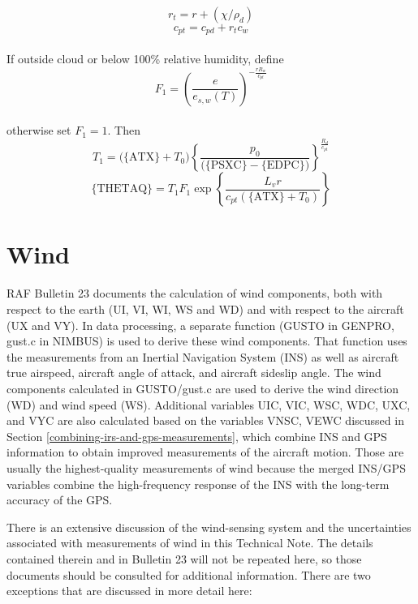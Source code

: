 \documentclass[
  english,
]{book}
\begin{document}
\begin{equation}
r_{t}=r+(\chi/\rho_{d})
\label{eq:rtotBox}
\end{equation}
\begin{equation}
c_{pt}=c_{pd}+r_{t}c_{w}
\label{eq:cptBox}
\end{equation}\\
If outside cloud or below 100\% relative humidity, define\\
\begin{equation}
F_{1}=\left(\frac{e}{e_{s,w}(T)}\right)^{-\frac{rR_{w}}{c_{pt}}}
\label{eq:F1}
\end{equation}\\
otherwise set \(F_{1}=1\). Then\\
\begin{equation}
T_{1}=\mathrm{(\{ATX\}}+T_{0})\left\{ \frac{p_{0}}{(\mathrm{\{PSXC\}}-\mathrm{\{EDPC\})}}\right\} ^{\frac{R_{d}}{c_{pt}}}
\label{eq:T1box}
\end{equation}
\begin{equation}
\mathrm{\{THETAQ\}}=T_{1}F_{1}\exp\left\{ \frac{L_{v}r}{c_{pt}(\{\mathrm{ATX\}}+T_{0})}\right\}
\label{eq:THETAQbox}
\end{equation}

\hypertarget{wind}{%
\section{Wind}\label{wind}}

RAF Bulletin 23 documents the calculation of wind components, both with respect to the earth (UI, VI, WI, WS and WD) and with respect to the aircraft (UX and VY). In data processing, a separate function (GUSTO in GENPRO, gust.c in NIMBUS) is used to derive these wind components. That function uses the measurements from an Inertial Navigation System (INS) as well as aircraft true airspeed, aircraft angle of attack, and aircraft sideslip angle. The wind components calculated in GUSTO/gust.c are used to derive the wind direction (WD) and wind speed (WS). Additional variables UIC, VIC, WSC, WDC, UXC, and VYC are also calculated based on the variables VNSC, VEWC discussed in Section \ref{combining-irs-and-gps-measurements}, which combine INS and GPS information to obtain improved measurements of the aircraft motion. Those are usually the highest-quality measurements of wind because the merged INS/GPS variables combine the high-frequency response of the INS with the long-term accuracy of the GPS.

There is an extensive discussion of the wind-sensing system and the uncertainties associated with measurements of wind in this Technical Note. The details contained therein and in Bulletin 23 will not be repeated here, so those documents should be consulted for additional information. There are two exceptions that are discussed in more detail here:
\end{document}
